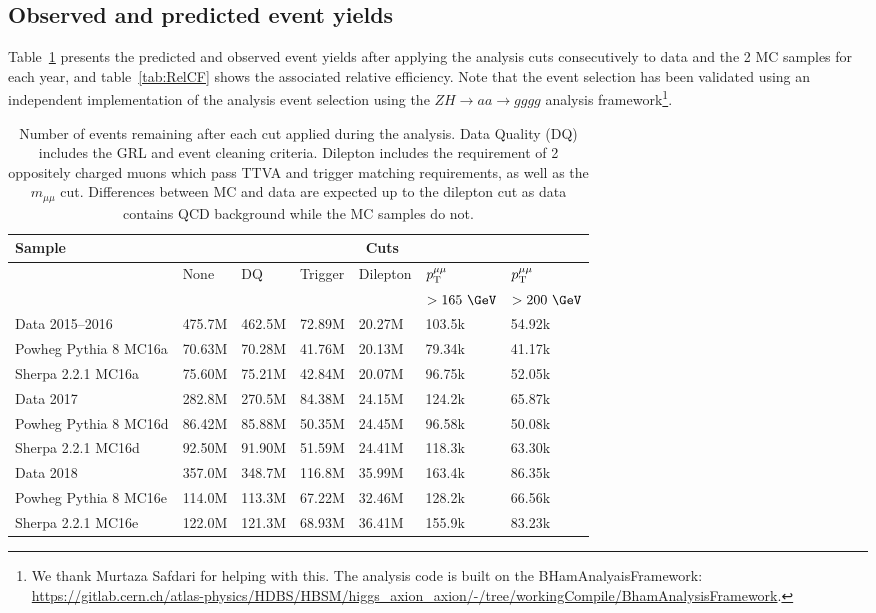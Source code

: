 
\subsection{Observed and predicted event yields}
\label{sec:cutflow}

Table~\ref{tab:CFComp} presents the predicted and observed event yields after applying the analysis cuts consecutively to data and the 2 MC samples for each year, and table~\ref{tab:RelCF} shows the associated relative efficiency.  Note that the event selection has been validated using an independent implementation of the analysis event selection using the $ZH\rightarrow aa\rightarrow gggg$ analysis framework\footnote{We thank Murtaza Safdari for helping with this.  The analysis code is built on the BHamAnalyaisFramework: \url{https://gitlab.cern.ch/atlas-physics/HDBS/HBSM/higgs_axion_axion/-/tree/workingCompile/BhamAnalysisFramework}.}.

\begin{table}[h!]
    \centering
    \begin{tabular}{l|l|l|l|l|l|l}
    \hline\hline
    \textbf{Sample} & \multicolumn{6}{c}{\textbf{Cuts}} \\ \hline
     & None & DQ & Trigger & Dilepton & $p_\mathrm{T}^{\mu\mu}$ & $p_\mathrm{T}^{\mu\mu}$ \\
     &  &  &  &  & $>165~\GeV$ & $>200~\GeV$ \\ \hline\hline
    Data 2015--2016 & 475.7M & 462.5M & 72.89M & 20.27M & 103.5k & 54.92k \\ \hline
    Powheg Pythia 8 MC16a & 70.63M & 70.28M & 41.76M & 20.13M & 79.34k & 41.17k \\ \hline
    Sherpa 2.2.1 MC16a & 75.60M & 75.21M & 42.84M & 20.07M & 96.75k & 52.05k \\ \hline\hline
    Data 2017 & 282.8M & 270.5M & 84.38M & 24.15M & 124.2k & 65.87k \\ \hline
    Powheg Pythia 8 MC16d & 86.42M & 85.88M & 50.35M & 24.45M & 96.58k & 50.08k \\ \hline
    Sherpa 2.2.1 MC16d & 92.50M & 91.90M & 51.59M & 24.41M & 118.3k & 63.30k \\ \hline\hline
    Data 2018 & 357.0M & 348.7M & 116.8M & 35.99M & 163.4k & 86.35k \\ \hline
    Powheg Pythia 8 MC16e & 114.0M & 113.3M & 67.22M & 32.46M & 128.2k & 66.56k \\ \hline
    Sherpa 2.2.1 MC16e & 122.0M & 121.3M & 68.93M & 36.41M & 155.9k & 83.23k \\ \hline\hline
    \end{tabular}
    \caption{Number of events remaining after each cut applied during the analysis. Data Quality (DQ) includes the GRL and event cleaning criteria.
    Dilepton includes the requirement of 2 oppositely charged muons which pass TTVA and trigger matching requirements, as well as the $m_{\mu\mu}$ cut.
    Differences between MC and data are expected up to the dilepton cut as data contains QCD background while the MC samples do not.}
    \label{tab:CFComp}
\end{table}

